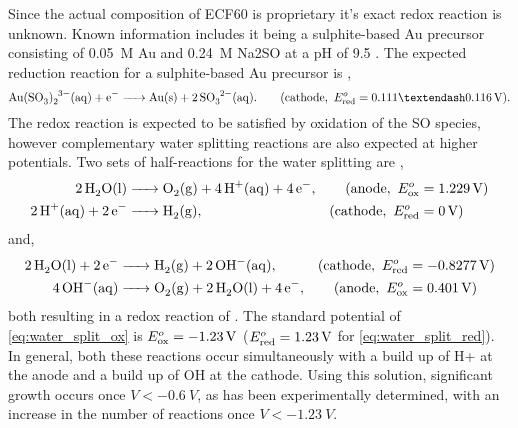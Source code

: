\documentclass{article}
\begin{document}
Since the actual composition of ECF60 is proprietary it's exact redox reaction is unknown. Known information includes it being a sulphite-based Au precursor consisting of \SI{0.05}{M} Au and \SI{0.24}{M} Na\subs2SO at a pH of 9.5 \cite{roy2009electrochemical}. The expected reduction reaction for a sulphite-based Au precursor is \cite{green2007gold},
\begin{equation}
	\cee{Au(SO3)2^{3-}(aq) + e- -> Au(s) + 2SO3^{2-}(aq)}. \qquad (\mathrm{cathode},\ \Ered=0.111\textendash\SI{0.116}{V}).
\end{equation}
The redox reaction is expected to be satisfied by oxidation of the SO species, however complementary water splitting reactions are also expected at higher potentials. Two sets of half-reactions for the water splitting are \cite{haynes2013crc},
\begin{subequations}
\begin{align}
	\cee{2H2O(l) &-> O2(g) + 4H+(aq) + 4e-}, &(\mathrm{anode},\ \Eox&=\SI{1.229}{V}) \label{eq:water_split_ox} \\
	\cee{2H+(aq) + 2e- &-> H2(g)}, &(\mathrm{cathode},\ \Ered&=\SI{0}{V})
\end{align}
\end{subequations}
and,
\begin{subequations}
\begin{align}
	\cee{2H2O(l) + 2e- &-> H2(g) + 2OH^-(aq)}, &(\mathrm{cathode},\ \Ered&=\SI{-0.8277}{V}) \label{eq:water_split_red} \\
	\cee{4OH^-(aq) &-> O2(g) + 2H2O(l) + 4e-}, &(\mathrm{anode},\ \Eox&=\SI{0.401}{V})
\end{align}
\end{subequations}
both resulting in a redox reaction of . The standard potential of \eqref{eq:water_split_ox} is $E^o_{\mathrm{ox}}=\SI{-1.23}{V}$ ($E^o_{\mathrm{red}}=\SI{1.23}{V}$ for \eqref{eq:water_split_red}). In general, both these reactions occur simultaneously with a build up of H\sups+ at the anode and a build up of OH\sups{\textminus} at the cathode. %
Using this solution, significant growth occurs once $V<\SI{-0.6}{V}$, as has been experimentally determined, with an increase in the number of reactions once $V<\SI{-1.23}{V}$.
\end{document}
